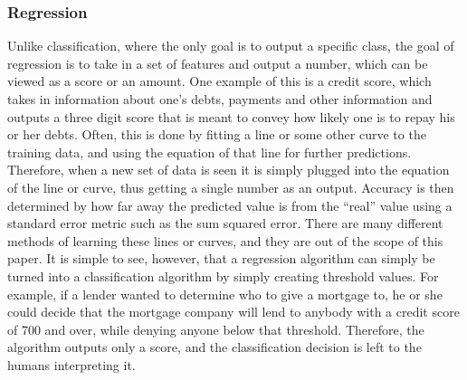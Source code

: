 \documentclass[12pt]{article} %
\begin{document}
\subsubsection{Regression}
Unlike classification, where the only goal is to output a specific class, the goal of regression is to take in a set of features and output a number, which can be viewed as a score or an amount. One example of this is a credit score, which takes in information about one's debts, payments and other information and outputs a three digit score that is meant to convey how likely one is to repay his or her debts. Often, this is done by fitting a line or some other curve to the training data, and using the equation of that line for further predictions. Therefore, when a new set of data is seen it is simply plugged into the equation of the line or curve, thus getting a single number as an output. Accuracy is then determined by how far away the predicted value is from the ``real'' value using a standard error metric such as the sum squared error. There are many different methods of learning these lines or curves, and they are out of the scope of this paper. It is simple to see, however, that a regression algorithm can simply be turned into a classification algorithm by simply creating threshold values. For example, if a lender wanted to determine who to give a mortgage to, he or she could decide that the mortgage company will lend to anybody with a credit score of 700 and over, while denying anyone below that threshold. Therefore, the algorithm outputs only a score, and the classification decision is left to the humans interpreting it. 
\end{document}
